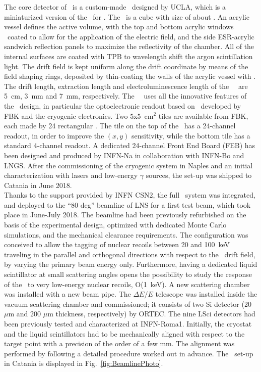 The core detector of \ReD\ is a custom-made \TPC\ designed by UCLA, which is a miniaturized 
version of the \LArTPC\ for \DSks.  The \TPC\ is a cube with size of about 
\GAPTPCActiveDiameter.  An acrylic vessel defines the active volume, with the top and 
bottom acrylic windows \ITO\ coated to allow for the application of the electric field, and the 
side ESR-acrylic sandwich reflection panels to maximize the reflectivity of the chamber. 
All of the internal surfaces are coated with TPB to wavelength shift the argon scintillation 
light. The drift field is kept uniform along the drift coordinate by means of the field shaping 
rings, deposited by thin-coating the walls of the acrylic vessel with \ITO. The drift 
length, extraction length and electroluminescence length of the \ReD\ \TPC\ are 5~cm, 3~mm 
and 7~mm, respectively. The \ReD\ \TPC\ uses all the innovative features of the \DSks\ 
design, in particular the optoelectronic readout based on \SiPM\ developed by FBK and the 
cryogenic electronics. Two 5x5~cm$^2$ tiles are available from FBK, each made by 24 
rectangular \SiPMs.  The tile on the top of the \LArTPC\ has a 24-channel readout, in order 
to improve the $(x,y)$ sensitivity, while the bottom tile has a standard 4-channel readout.  
A dedicated 24-channel Front End Board (FEB) has been designed and produced by INFN-Na in 
collaboration with INFN-Bo and LNGS. After the commissioning of the cryogenic system 
in Naples and an initial characterization with lasers and low-energy $\gamma$ sources, 
the set-up was shipped to Catania in June 2018. \\

Thanks to the support provided by INFN CSN2, the full \ReD\ system was integrated, and deployed 
to the ``80 deg'' beamline of LNS for a first test beam, which took place in June-July 2018. 
The beamline had been previously refurbished on the basis of the experimental design, 
optimized with dedicated Monte Carlo simulations, and the mechanical clearance requirements. 
The configuration was conceived to allow the tagging of nuclear recoils between 20 and 100~keV 
traveling in the parallel and orthogonal directions with respect to the \TPC\ drift field, 
by varying the primary beam energy only. Furthermore, having a dedicated liquid 
scintillator at small scattering angles opens the possibility to study the response of the 
\TPC\ to very low-energy nuclear recoils, O(1~keV).  A new scattering chamber was 
installed with a new beam pipe. The $\Delta E/E$ telescope was installed inside the 
vacuum scattering chamber and commissioned; it consists of two Si detector (20 $\mu$m and 
200 $\mu$m thickness, respectively) by ORTEC. The nine LSci detectors had been previously 
tested and characterized at INFN-Roma1.
Initially, the cryostat and the liquid scintillators had to be mechanically aligned with respect 
to the target point with a precision of the order of a few mm. The alignment was performed by 
following a detailed procedure worked out in advance. The \ReD\ set-up in Catania is 
displayed in Fig.~\ref{fig:BeamlinePhoto}. 

